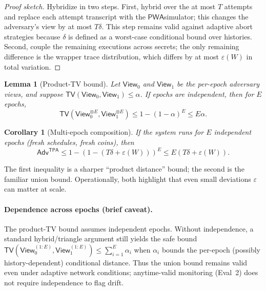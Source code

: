 \documentclass[11pt]{article}
\newtheorem{lemma}{Lemma}
\newtheorem{corollary}{Corollary}
\newcommand{\Adv}{\ensuremath{\mathsf{Adv}}}
\newcommand{\PWA}{\ensuremath{\mathsf{PWA}}}
\newcommand{\TPA}{\ensuremath{\mathsf{TPA}}}
\newcommand{\tv}{\ensuremath{\mathsf{TV}}}
\begin{document}
\begin{proof}[Proof sketch]
Hybridize in two steps.
First, hybrid over the at most $T$ attempts and replace each attempt transcript with the \PWA simulator; this changes the adversary's view by at most $T\delta$.
This step remains valid against adaptive abort strategies because $\delta$ is defined as a worst-case conditional bound over histories.
Second, couple the remaining executions across secrets; the only remaining difference is the wrapper trace distribution, which differs by at most $\varepsilon(W)$ in total variation.
\end{proof}

\begin{lemma}[Product-TV bound]
Let $\mathsf{View}_{0}$ and $\mathsf{View}_{1}$ be the per-epoch adversary views, and suppose
$\tv(\mathsf{View}_{0},\mathsf{View}_{1})\le \alpha$.
If epochs are independent, then for $E$ epochs,
\[\tv(\mathsf{View}_{0}^{\otimes E},\mathsf{View}_{1}^{\otimes E})\le 1-(1-\alpha)^E\le E\alpha.\]
\end{lemma}

\begin{corollary}[Multi-epoch composition]
If the system runs for $E$ independent epochs (fresh schedules, fresh coins), then
\[\Adv^{\TPA}\le 1-(1-(T\delta+\varepsilon(W)))^E\le E(T\delta+\varepsilon(W)).\]
\end{corollary}

The first inequality is a sharper ``product distance'' bound; the second is the familiar union bound.
Operationally, both highlight that even small deviations $\varepsilon$ can matter at scale.

\paragraph{Dependence across epochs (brief caveat).}
The product-TV bound assumes independent epochs.
Without independence, a standard hybrid/triangle argument still yields the safe bound
$\tv(\mathsf{View}_{0}^{(1{:}E)},\mathsf{View}_{1}^{(1{:}E)}) \le \sum_{i=1}^{E}\alpha_i$ when $\alpha_i$ bounds the per-epoch (possibly history-dependent) conditional distance.
Thus the union bound remains valid even under adaptive network conditions; anytime-valid monitoring (Eval~2) does not require independence to flag drift.
\end{document}
